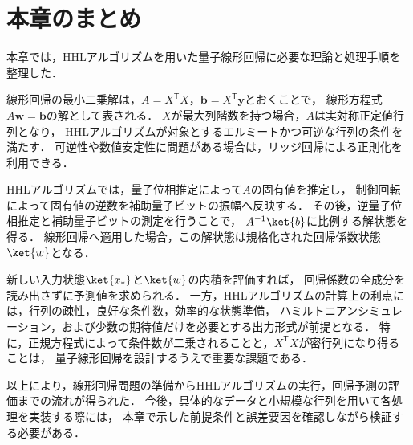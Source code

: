\section{本章のまとめ}
\label{sec:hhl-chapter-summary}

本章では，HHLアルゴリズムを用いた量子線形回帰に必要な理論と処理手順を整理した．

線形回帰の最小二乗解は，$A=X^{\mathsf{T}}X$，$\bm{b}=X^{\mathsf{T}}\bm{y}$とおくことで，
線形方程式$A\bm{w}=\bm{b}$の解として表される．
$X$が最大列階数を持つ場合，$A$は実対称正定値行列となり，
HHLアルゴリズムが対象とするエルミートかつ可逆な行列の条件を満たす．
可逆性や数値安定性に問題がある場合は，リッジ回帰による正則化を利用できる．

HHLアルゴリズムでは，量子位相推定によって$A$の固有値を推定し，
制御回転によって固有値の逆数を補助量子ビットの振幅へ反映する．
その後，逆量子位相推定と補助量子ビットの測定を行うことで，
$A^{-1}\ket{b}$に比例する解状態を得る．
線形回帰へ適用した場合，この解状態は規格化された回帰係数状態$\ket{w}$となる．

新しい入力状態$\ket{x_{*}}$と$\ket{w}$の内積を評価すれば，
回帰係数の全成分を読み出さずに予測値を求められる．
一方，HHLアルゴリズムの計算上の利点には，行列の疎性，良好な条件数，効率的な状態準備，
ハミルトニアンシミュレーション，および少数の期待値だけを必要とする出力形式が前提となる．
特に，正規方程式によって条件数が二乗されることと，$X^{\mathsf{T}}X$が密行列になり得ることは，
量子線形回帰を設計するうえで重要な課題である．

以上により，線形回帰問題の準備からHHLアルゴリズムの実行，回帰予測の評価までの流れが得られた．
今後，具体的なデータと小規模な行列を用いて各処理を実装する際には，
本章で示した前提条件と誤差要因を確認しながら検証する必要がある．
